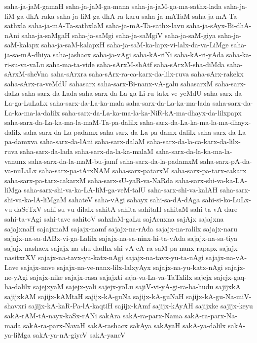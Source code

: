{saha-ja-jaM-gamaH
saha-ja-jaM-ga-mana
saha-ja-jaM-ga-ma-sathx-lada
saha-ja-liM-ga-dhA-raka
saha-ja-liM-ga-dhA-ra-karu
saha-ja-mATaM
saha-ja-mA-Ta-sathxla
saha-ja-mA-Ta-sathxlaM
saha-ja-mA-Ta-sathx-lavu
saha-ja-sAyx-Bi-dhA-nAni
saha-ja-saMgaH
saha-ja-saMgi
saha-ja-saMgiV
saha-ja-saM-giya
saha-ja-saM-kalapx
saha-ja-saM-kalapxH
saha-ja-saM-ka-lapx-vi-lalx-da-va-LiMge
saha-ja-sa-mA-dhiya
saha-jashacx
saha-ja-vAgi
saha-kA-riNi
saha-kA-ri-yAda
saha-ka-ri-su-va-vaLu
saha-ma-ta-vide
saha-sArxM-shAtf
saha-sArxM-sha-diMda
saha-sArxM-sheVna
saha-sArxra
saha-sArx-ra-ca-karx-da-lilx-ruva
saha-sArx-rakekx
saha-sArx-ra-veMdU
sahasarx
saha-sarx-Bi-nanx-vA-galu
sahasarxM
saha-sarx-daLa
saha-sarx-da-Lada
saha-sarx-da-La-ga-Li-ru-tatx-ve-yeMdU
saha-sarx-da-La-ga-LuLaLx
saha-sarx-da-La-ka-mala
saha-sarx-da-La-ka-ma-lada
saha-sarx-da-La-ka-ma-la-dalilx
saha-sarx-da-La-ka-ma-la-ka-NiR-kA-ma-dhayx-da-lilxpapx
saha-sarx-da-La-ka-ma-la-maM-Ta-pa-dalilx
saha-sarx-da-La-ka-ma-la-ma-dhayx-dalilx
saha-sarx-da-La-padamx
saha-sarx-da-La-pa-damx-dalilx
saha-sarx-da-La-pa-damxva
saha-sarx-da-lAni
saha-sarx-dalaM
saha-sarx-da-la-ca-karx-da-lilx-ruva
saha-sarx-da-lada
saha-sarx-da-la-ka-malaM
saha-sarx-da-la-ka-ma-la-vanunx
saha-sarx-da-la-maM-bu-jamf
saha-sarx-da-la-padamxM
saha-sarx-pA-da-va-nuLaLx
saha-sarx-pa-tArxNAM
saha-sarx-patarxM
saha-sarx-pa-tarx-cakarx
saha-sarx-pa-tarx-cakarxM
saha-sarx-sU-yaR-va-NaRda
saha-sarx-shi-va-ka-LA-liMga
saha-sarx-shi-va-ka-LA-liM-ga-veM-talU
saha-sarx-shi-va-kalAH
saha-sarx-shi-va-ka-lA-liMgaM
sahateV
saha-vAgi
sahayx
sahi-sa-dA-dAga
sahi-si-ko-LuLx-vu-daSeTxV
sahi-su-vu-dilalx
sahitA
sahita
sahitaH
sahitaM
sahi-ta-vA-dare
sahi-ta-vAgi
sahi-tave
sahitoV
sahxlaM-gaLu
sajAcnxna
sajAjx
sajajxna
sajajxnaH
sajajxnaM
sajajx-namf
sajajx-na-rAda
sajajx-na-ralilx
sajajx-naru
sajajx-na-sa-dABx-vi-ga-Lalilx
sajajx-na-sa-ninx-hi-ta-vAda
sajajx-na-sa-tiya
sajajx-nashacx
sajajx-na-shu-dadhx-shi-vA-cA-ra-saM-pa-nanx-rapapx
sajajx-nasitxrXV
sajajx-na-tavx-yu-katx-nAgi
sajajx-na-tavx-yu-ta-nAgi
sajajx-na-vA-Lave
sajajx-nave
sajajx-na-ve-nanx-lilx-lalxyAyx
sajajx-na-yu-katx-nAgi
sajajx-ne-yAgi
sajajx-nike
sajajx-rasa
sajajxti
saja-va-La-va-TaTxlilx
sajejx
sajejx-gaq-ha-dalilx
sajejxyaM
sajejx-yali
sajejx-yoLu
sajiV-vi-yA-gi-ra-ba-hudu
sajijxkA
sajijxkAM
sajijx-kAMtaH
sajijx-kA-guNa
sajijx-kA-guNaH
sajijx-kA-gu-Na-miV-shavxri
sajijx-kA-kaR-Pa-lA-kaqtiH
sajijx-kAmf
sajijx-kAyAH
sajijxke
sajijx-keyu
sakA-rAM-tA-nayx-kaSx-rANi
sakAra
sakA-ra-parx-Nama
sakA-ra-parx-Na-mada
sakA-ra-parx-NavaH
sakA-rashacx
sakAya
sakAyaH
sakA-ya-dalilx
sakA-ya-liMga
sakA-ya-nA-giyeV
sakA-yaneV
}
